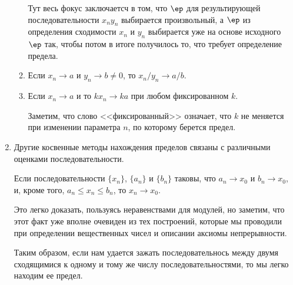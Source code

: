 \begin{enumerate}
\begin{enumerate}[\bf {Lim}1]
Тут весь фокус заключаетсч в том, что $\ep$ для результирующей последовательности $x_ny_n$ выбирается произвольный, а $\ep$ из определения сходимости $x_n$ и $y_n$ выбирается уже на основе исходного $\ep$ так, чтобы потом в итоге получилось то, что требует определение предела.
\item Если $x_n\to a$ и $y_n\to b\ne 0$, то $x_n/y_n\to a/b$.
\item Если $x_n\to a$ и то $kx_n\to ka$ при любом фиксированном $k$.

Заметим, что слово <<фиксированный>> означает, что $k$ не меняется при изменении параметра $n$, по которому берется предел.
\end{enumerate}

\item Другие косвенные методы нахождения пределов связаны с различными оценками последовательности.
\begin{lem}
Если последовательности $\{x_n\}$, $\{a_n\}$ и $\{b_n\}$ таковы, что $a_n\to x_0$ и $b_n\to x_0$, и, кроме того, $a_n\le x_n\le b_n$, то $x_n\to x_0$.
\end{lem}
Это легко доказать, пользуясь неравенствами для модулей, но заметим, что этот факт уже вполне очевиден из тех построений, которые мы проводили при определении вещественных чисел и описании аксиомы непрерывности.

Таким образом, если нам удается зажать последовательнось между двумя сходящимися к одному и тому же числу последовательностями, то мы легко находим ее предел.






\end{enumerate}
